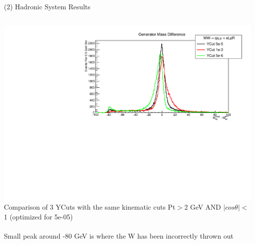 \documentclass[10pt]{beamer}
\begin{document}
\begin{frame}{(2) Hadronic System Results}

\begin{columns}
\begin{column}{0.5\textwidth}
   	\includegraphics[scale=0.3, left]{SupDiff.pdf}\\
   	\scriptsize
   	Comparison of 3 YCuts with the same kinematic cuts Pt$>$2 GeV AND $|cos\theta|<$1 (optimized for 5e-05)\\
   	\quad \quad \\
   	Small peak around -80 GeV is where the W has been incorrectly thrown out\\
   	\quad \quad \\
   	

\end{column}
\end{columns}
\end{frame}
\end{document}
